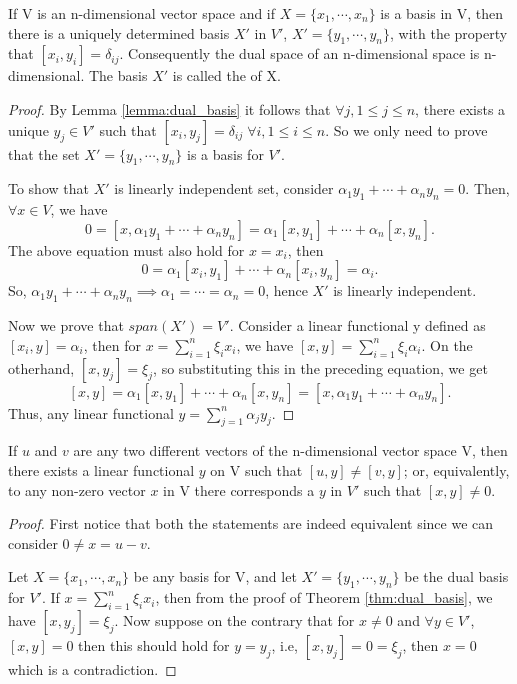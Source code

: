 \documentclass[10pt,a4paper]{article}
\begin{document}
\begin{theorem}\label{thm:dual_basis}
    If V is an n-dimensional vector space and if $X = \{x_1,\cdots,x_n\}$ is a basis in V, then there is a uniquely determined basis $X'$ in $V'$, $X' = \{y_1, \cdots, y_n\}$, with the property that $[x_i, y_i] = \delta_{ij}$. Consequently the dual space of an n-dimensional space is n-dimensional. The basis $X'$ is called the  of X.
\end{theorem}

\begin{proof}
    By Lemma \ref{lemma:dual_basis} it follows that $\forall j,1\le j\le n$, there exists a unique $y_j\in V'$ such that $[x_i,y_j]=\delta_{ij}\;\forall i,1\le i\le n$. So we only need to prove that the set $X' = \{y_1, \cdots, y_n\}$ is a basis for $V'$.

    To show that $X'$ is linearly independent set, consider $\alpha_1y_1+\cdots+\alpha_ny_n=0$. Then, $\forall x\in V$, we have
    $$
        0 = [x,\alpha_1y_1+\cdots+\alpha_ny_n] = \alpha_1[x,y_1]+\cdots+\alpha_n[x,y_n].
    $$
    The above equation must also hold for $x = x_i$, then 
    $$
        0 = \alpha_1[x_i,y_1]+\cdots+\alpha_n[x_i,y_n] = \alpha_i.
    $$
    So, $\alpha_1y_1+\cdots+\alpha_ny_n\implies \alpha_1 = \cdots = \alpha_n = 0$, hence $X'$ is linearly independent.

    Now we prove that $span(X')=V'$. Consider a linear functional y defined as $[x_i,y]=\alpha_i$, then for $x=\sum_{i=1}^n\xi_ix_i$, we have $[x,y]=\sum_{i=1}^n\xi_i\alpha_i$. On the otherhand, $[x,y_j] = \xi_j$, so substituting this in the preceding equation, we get 
    $$
        [x,y] = \alpha_1[x,y_1]+\cdots+\alpha_n[x,y_n] = [x,\alpha_1y_1+\cdots+\alpha_ny_n].
    $$
    Thus, any linear functional $y = \sum_{j=1}^n\alpha_jy_j$.
\end{proof}

\begin{corollary}\label{cor:dual_basis}
    If $u$ and $v$ are any two different vectors of the n-dimensional vector space V, then there exists a linear functional $y$ on V such that $[u, y] \neq [v, y]$; or, equivalently, to any non-zero vector $x$ in V there corresponds a $y$ in $V'$ such that $[x, y] \neq 0$.
\end{corollary}

\begin{proof}
    First notice that both the statements are indeed equivalent since we can consider $0\neq x = u-v$.

    Let $X = \{x_1,\cdots,x_n\}$ be any basis for V, and let $X'=\{y_1,\cdots,y_n\}$ be the dual basis for $V'$. If $x=\sum_{i=1}^n\xi_ix_i$, then from the proof of Theorem \ref{thm:dual_basis}, we have $[x,y_j] = \xi_j$. 
    Now suppose on the contrary that for $x\neq 0$ and $\forall y\in V'$, $[x,y]=0$ then this should hold for $y=y_j$, i.e, $[x,y_j]=0=\xi_j$, then $x=0$ which is a contradiction.
\end{proof}
\end{document}
